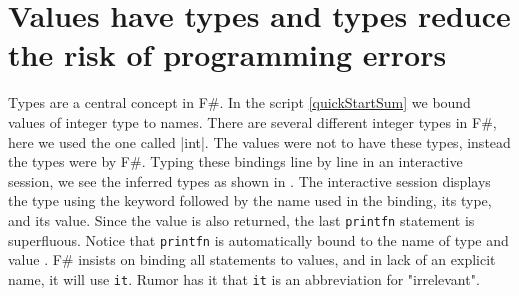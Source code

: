 \documentclass[springer.tex]{subfiles}
\begin{document}
\section{Values have types and types reduce the risk of programming errors}
Types are a central concept in F\#. In the script \ref{quickStartSum} we bound values of integer type to names. There are several different integer types in F\#, here we used the one called \keyword|int|. The values were not  to have these types, instead the types were  by F\#. Typing these bindings line by line in an interactive session, we see the inferred types as shown in .
%
%
The interactive session displays the type using the  keyword followed by the name used in the binding, its type, and its value. Since the value is also returned, the last \lstinline|printfn| statement is superfluous. Notice that \lstinline{printfn} is automatically bound to the name  of type  and value \idx[{()}@\lstinline{()}]{\lexeme{()}}. F\# insists on binding all statements to values, and in lack of an explicit name, it will use \lstinline{it}. Rumor has it that \lstinline{it} is an abbreviation for "irrelevant".
\end{document}

